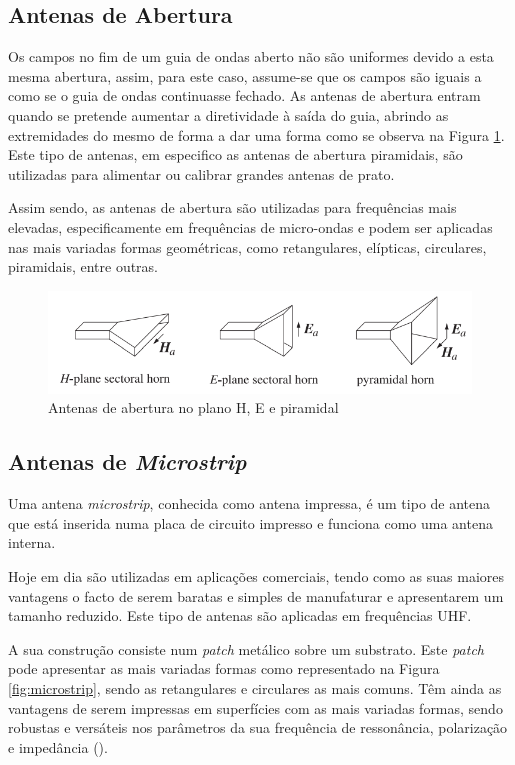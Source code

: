 \subsection*{Antenas de Abertura}
Os campos no fim de um guia de ondas aberto não são uniformes devido a esta mesma abertura, assim, para este caso, assume-se que os campos são iguais a como se o guia de ondas continuasse fechado. As antenas de abertura entram quando se pretende aumentar a diretividade à saída do guia, abrindo as extremidades do mesmo de forma a dar uma forma como se observa na Figura \ref{fig:aperture antenna2}. Este tipo de antenas, em especifico as antenas de abertura piramidais, são utilizadas para alimentar ou calibrar grandes antenas de prato.\par
Assim sendo, as antenas de abertura são utilizadas para frequências mais elevadas, especificamente em frequências de micro-ondas e podem ser aplicadas nas mais variadas formas geométricas, como retangulares, elípticas, circulares, piramidais, entre outras.

\begin{figure}[h]
\centering
\includegraphics[scale=0.6]{chapters/ch3/assets/aperture_antenna2}
\caption[Antena de Abertura]{Antenas de abertura no plano H, E e piramidal}
\label{fig:aperture antenna2}
\end{figure}


\subsection*{Antenas de \textit{Microstrip}}
Uma antena \textit{microstrip}, conhecida como antena impressa, é um tipo de antena que está inserida numa placa de circuito impresso e funciona como uma antena interna.\par
Hoje em dia são utilizadas em aplicações comerciais, tendo como as suas maiores vantagens o facto de serem baratas e simples de manufaturar e apresentarem um tamanho reduzido. Este tipo de antenas são aplicadas em frequências \gls{UHF}.\par 
A sua construção consiste num \textit{patch} metálico sobre um substrato. Este \textit{patch} pode apresentar as mais variadas formas como representado na Figura \ref{fig:microstrip}, sendo as retangulares e circulares as mais comuns. Têm ainda as vantagens de serem impressas em superfícies com as mais variadas formas, sendo robustas e versáteis nos parâmetros da sua frequência de ressonância, polarização e impedância (\cite{Balanis2016}).

